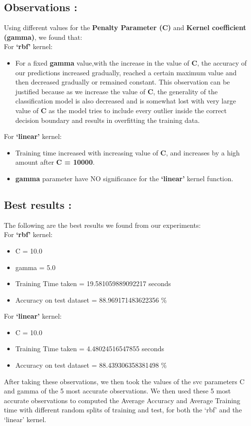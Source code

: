 \documentclass{report}
\begin{document}
\begin{multicols}{2}
\subsection{\LARGE Observations :}
Using different values for the \textbf{Penalty Parameter (C)} and \textbf{Kernel coefficient (gamma)}, we found that:\\
\linebreak
\linebreak
{For \textbf{‘rbf’} kernel:}
\setlength{\itemsep}{0cm}
\begin{itemize}
\item For a fixed \textbf{gamma} value,with the increase in the value of \textbf{C}, the accuracy of our predictions increased gradually, reached a certain maximum value and then decreased gradually or remained constant. This observation can be justified because as we increase the value of \textbf{C}, the generality of the classification model is also decreased and is somewhat lost with very large value of \textbf{C} as the model tries to include every outlier inside the correct decision boundary and results in overfitting the training data.

\end{itemize}
For \textbf{‘linear’} kernel:
\begin{itemize}
\item Training time increased with increasing value of \textbf{C}, and increases by a high amount after \textbf{C = 10000}.
\item \textbf{gamma} parameter have NO significance for the \textbf{‘linear’} kernel function.
\end{itemize}
\subsection{\LARGE Best results :}
The following are the best results we found from our experiments:\\
\linebreak
For \textbf{‘rbf’} kernel:
\begin{itemize}
\item C = 10.0
\item gamma = 5.0
\item Training Time taken = 19.581059889092217 seconds
\item Accuracy on test dataset = 88.969171483622356 \%
\end{itemize}
For \textbf{‘linear’} kernel:
\begin{itemize}
\item C = 10.0 
\item Training Time taken = 4.48024516547855 seconds
\item Accuracy on test dataset = 88.439306358381498 \%
\end{itemize}
After taking these observations, we then took the values of the svc parameters C and gamma of the 5 most accurate observations.
We then used these 5 most accurate observations to computed the Average Accuracy and Average Training time with different 
random splits of training and test, for both the ‘rbf’ and the ‘linear’ kernel.
\end{multicols}
\pagebreak
\end{document}

